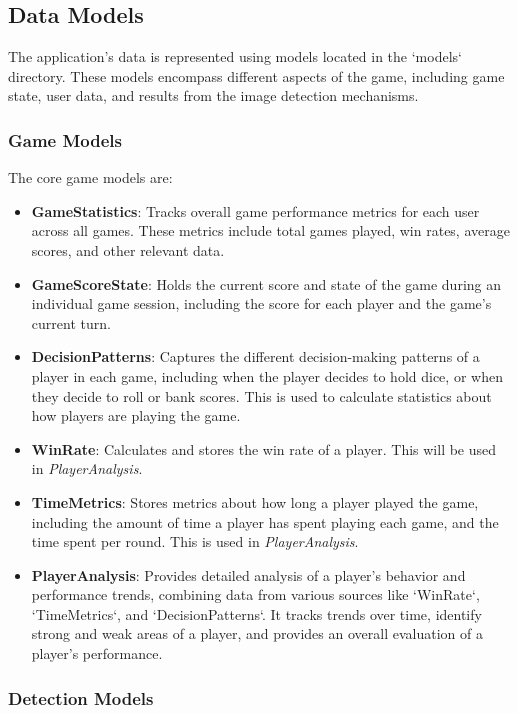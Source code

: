 \subsection{Data Models}

The application's data is represented using models located in the `models` directory. These models encompass different aspects of the game, including game state, user data, and results from the image detection mechanisms.

\subsubsection{Game Models}

The core game models are:
\begin{itemize}
    \item \textbf{GameStatistics}: Tracks overall game performance metrics for each user across all games. These metrics include total games played, win rates, average scores, and other relevant data.
    \item \textbf{GameScoreState}: Holds the current score and state of the game during an individual game session, including the score for each player and the game's current turn.
     \item \textbf{DecisionPatterns}: Captures the different decision-making patterns of a player in each game, including when the player decides to hold dice, or when they decide to roll or bank scores. This is used to calculate statistics about how players are playing the game.
    \item \textbf{WinRate}: Calculates and stores the win rate of a player. This will be used in \textit{PlayerAnalysis}.
    \item \textbf{TimeMetrics}: Stores metrics about how long a player played the game, including the amount of time a player has spent playing each game, and the time spent per round. This is used in \textit{PlayerAnalysis}.
    \item \textbf{PlayerAnalysis}: Provides detailed analysis of a player's behavior and performance trends, combining data from various sources like `WinRate`, `TimeMetrics`, and `DecisionPatterns`. It tracks trends over time, identify strong and weak areas of a player, and provides an overall evaluation of a player's performance.
\end{itemize}

\subsubsection{Detection Models}

